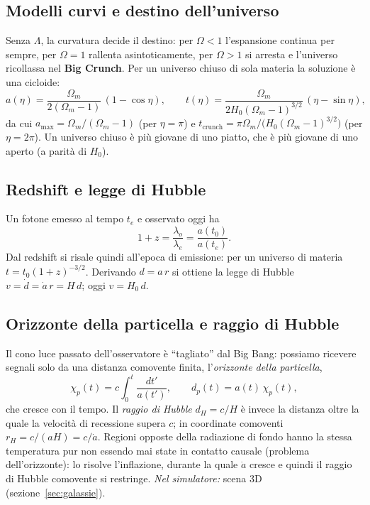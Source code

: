 \documentclass[11pt,a4paper]{article}
\newcommand{\Om}{\Omega_m}
\begin{document}
\subsection{Modelli curvi e destino dell'universo}
Senza $\Lambda$, la curvatura decide il destino: per $\Omega<1$ l'espansione continua per sempre, per $\Omega=1$ rallenta asintoticamente, per $\Omega>1$ si arresta e l'universo ricollassa nel \textbf{Big Crunch}. Per un universo chiuso di sola materia la soluzione è una cicloide:
\begin{equation}
  a(\eta)=\frac{\Om}{2(\Om-1)}\,(1-\cos\eta),\qquad
  t(\eta)=\frac{\Om}{2H_0(\Om-1)^{3/2}}\,(\eta-\sin\eta),
\end{equation}
da cui $a_{\max}=\Om/(\Om-1)$ (per $\eta=\pi$) e $t_{\text{crunch}}=\pi\Om/\big(H_0(\Om-1)^{3/2}\big)$ (per $\eta=2\pi$).
Un universo chiuso è più giovane di uno piatto, che è più giovane di uno aperto (a parità di $H_0$).

\subsection{Redshift e legge di Hubble}
Un fotone emesso al tempo $t_e$ e osservato oggi ha
\begin{equation}
  1+z = \frac{\lambda_o}{\lambda_e} = \frac{a(t_0)}{a(t_e)} .
\end{equation}
Dal redshift si risale quindi all'epoca di emissione: per un universo di materia $t=t_0(1+z)^{-3/2}$.
Derivando $d=a\,r$ si ottiene la legge di Hubble $v=\dot d=\dot a\,r=H\,d$; oggi $v=H_0\,d$.

\subsection{Orizzonte della particella e raggio di Hubble}
Il cono luce passato dell'osservatore è ``tagliato'' dal Big Bang: possiamo ricevere segnali solo da una distanza comovente finita, l'\emph{orizzonte della particella},
\begin{equation}
  \chi_p(t) = c\int_0^{t}\frac{dt'}{a(t')}, \qquad d_p(t)=a(t)\,\chi_p(t),
\end{equation}
che cresce con il tempo. Il \emph{raggio di Hubble} $d_H=c/H$ è invece la distanza oltre la quale la velocità di recessione supera $c$; in coordinate comoventi $r_H=c/(aH)=c/\dot a$.
Regioni opposte della radiazione di fondo hanno la stessa temperatura pur non essendo mai state in contatto causale (problema dell'orizzonte): lo risolve l'inflazione, durante la quale $\dot a$ cresce e quindi il raggio di Hubble comovente si restringe.
\emph{Nel simulatore:} scena 3D (sezione~\ref{sec:galassie}).
\end{document}
